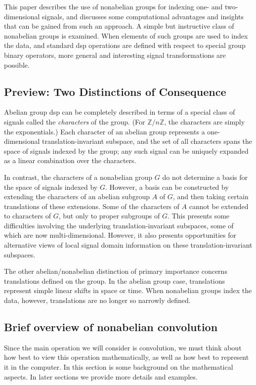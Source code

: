 \documentclass[reqno,onecolumn,oneside]{paper}
\newcommand{\<}{\ensuremath{\langle}}
\renewcommand{\>}{\ensuremath{\rangle}}
\newcommand{\field}[1]{\ensuremath{\mathbb{#1}}}
\newcommand{\Z}{\field{Z}}                   %
\begin{document}
This paper describes the use of nonabelian groups
for indexing one- and two-dimensional signals, and discusses 
some computational advantages and insights that can be gained from 
such an approach. 
A simple but instructive class of 
nonabelian groups 
is examined.  When elements of such
groups are used to index the data, and standard \ac{dsp}
operations are defined with respect to special group
binary operators, more general and interesting
signal transformations are possible.
\subsection{Preview: Two Distinctions of Consequence}
Abelian group \ac{dsp} can be completely described in terms of a
special class of signals called the \emph{characters} of the
group. (For $\Z/n\Z$, the characters are simply the exponentials.)
Each character of an abelian group represents a one-dimensional
translation-invariant subspace, and the set of all characters
spans the space of signals indexed by the group; any such
signal can be uniquely expanded as a linear combination over
the characters.

In contrast, the characters of a nonabelian group $G$
do not determine a basis for the space of signals indexed by
$G$.  However, a basis can be constructed by extending the
characters of an abelian subgroup $A$ of $G$, and then taking
certain translations of these extensions.  Some of the
characters of $A$ cannot be extended to characters of $G$,
but only to proper subgroups of $G$.  This presents some
difficulties involving the underlying translation-invariant
subspaces, some of which are now multi-dimensional.
However, it also presents opportunities for alternative
views of local signal domain information on these
translation-invariant subspaces. 

The other abelian/nonabelian distinction of primary importance 
concerns translations defined on the group.  In the abelian group
case, translations represent simple linear shifts in space or time.
When nonabelian groups index the data, however, translations are no
longer so narrowly defined. 

\subsection{Brief overview of nonabelian convolution}
Since the main operation we will consider is convolution, we must 
think about how best to view this operation mathematically, as well as how best to
represent it in the computer.  In this section is some background on the
mathematical aspects.  In later sections we provide more details and examples.
\end{document}
